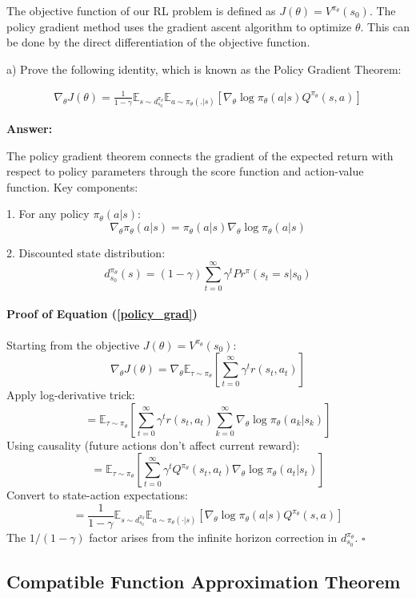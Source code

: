 The objective function of our RL problem is defined as $J(\theta) = V^{\pi_\theta}(s_0)$. The policy gradient method uses the gradient ascent algorithm to optimize $\theta$. This can be done by the direct differentiation of the objective function.

a) Prove the following identity, which is known as the Policy Gradient Theorem:

\begin{align}\label{policy_grad}
    \nabla_\theta J(\theta) = \frac{1}{1-\gamma}\mathbb{E}_{s \sim d^{\pi_\theta}_{s_0}}\mathbb{E}_{a \sim \pi_\theta(.|s)} [\nabla_\theta \log \pi_\theta (a|s) Q^{\pi_\theta} (s, a)]
\end{align}


\textbf{Answer:}

The policy gradient theorem connects the gradient of the expected return with respect to policy parameters through the score function and action-value function. Key components:

1. For any policy \(\pi_\theta(a|s)\):
\[
\nabla_\theta \pi_\theta(a|s) = \pi_\theta(a|s) \nabla_\theta \log \pi_\theta(a|s)
\]

2. Discounted state distribution: 
\[
d^{\pi_\theta}_{s_0}(s) = (1-\gamma) \sum_{t=0}^\infty \gamma^t Pr^\pi(s_t = s|s_0)
\]

\paragraph{Proof of Equation (\ref{policy_grad})}  
Starting from the objective \(J(\theta) = V^{\pi_\theta}(s_0)\):
\[
\nabla_\theta J(\theta) = \nabla_\theta \mathbb{E}_{\tau \sim \pi_\theta}\left[\sum_{t=0}^\infty \gamma^t r(s_t, a_t)\right]
\]
Apply log-derivative trick:
\[
= \mathbb{E}_{\tau \sim \pi_\theta}\left[\sum_{t=0}^\infty \gamma^t r(s_t, a_t) \sum_{k=0}^\infty \nabla_\theta \log \pi_\theta(a_k|s_k)\right]
\]
Using causality (future actions don't affect current reward):
\[
= \mathbb{E}_{\tau \sim \pi_\theta}\left[\sum_{t=0}^\infty \gamma^t Q^{\pi_\theta}(s_t, a_t) \nabla_\theta \log \pi_\theta(a_t|s_t)\right]
\]
Convert to state-action expectations:
\[
= \frac{1}{1-\gamma} \mathbb{E}_{s \sim d^{\pi_\theta}_{s_0}} \mathbb{E}_{a \sim \pi_\theta(\cdot|s)} \left[\nabla_\theta \log \pi_\theta(a|s) Q^{\pi_\theta}(s,a)\right]
\]
The \(1/(1-\gamma)\) factor arises from the infinite horizon correction in \(d^{\pi_\theta}_{s_0}\). \(\square\)


\subsection{Compatible Function Approximation Theorem}

